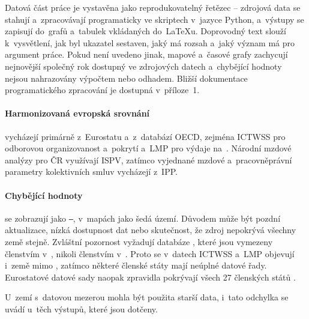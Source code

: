 
Datová část práce je vystavěna jako reprodukovatelný řetězec -- zdrojová data se
stahují a~zpracovávají programaticky ve skriptech v~jazyce Python,
a~výstupy se zapisují do~grafů a~tabulek vkládaných do~\LaTeX{}u. Doprovodný text
slouží k~vysvětlení, jak byl ukazatel sestaven, jaký má rozsah a~jaký význam má
pro argument práce. Pokud není uvedeno jinak, mapové a~časové grafy zachycují
nejnovější společný rok dostupný ve zdrojových datech a~chybějící hodnoty nejsou
nahrazovány výpočtem nebo odhadem. Bližší dokumentace programatického zpracování je dostupná v~příloze~1.\par

\paragraph{Harmonizovaná evropská srovnání}\label{par:data_zdroje} vycházejí primárně z~Eurostatu a~z~databází
\acs{OECD}, zejména \acs{ICTWSS} pro odborovou organizovanost a~pokrytí
 a~\acs{LMP} pro výdaje na~. Národní mzdové analýzy pro
\ac{ČR} využívají \acs{ISPV}, zatímco vyjednané mzdové a~pracovněprávní
parametry kolektivních smluv vycházejí z~\acs{IPP}.\par

\paragraph{Chybějící hodnoty}\label{par:missing} se zobrazují jako
\texttt{--}, v~mapách jako šedá území. Důvodem může být pozdní aktualizace,
nízká dostupnost dat nebo skutečnost, že zdroj nepokrývá všechny země
stejně. Zvláštní pozornost vyžadují databáze , které jsou vymezeny
členstvím v~, nikoli členstvím v~. Proto se v~datech
\acs{ICTWSS} a~\acs{LMP} objevují i~země mimo , zatímco některé
členské státy  mají neúplné datové řady. Eurostatové datové sady
naopak zpravidla pokrývají všech 27 členských států .\par
U~zemí s~datovou mezerou mohla být použita starší data, i~tato odchylka se uvádí 
u~těch výstupů, které jsou dotčeny.\par


